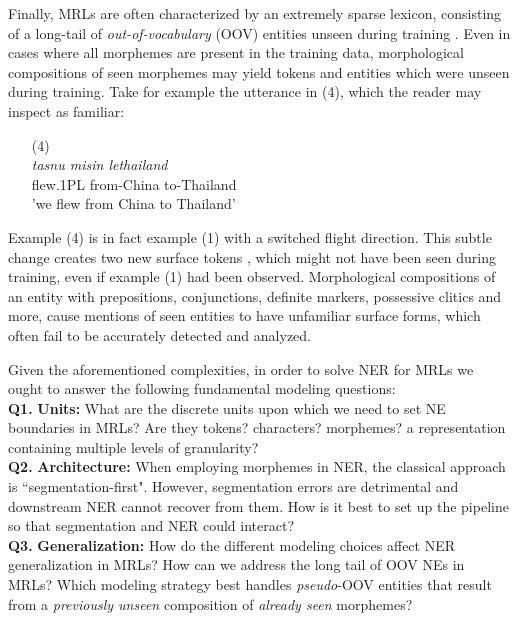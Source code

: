 \documentclass[11pt,a4paper]{article}
\begin{document}
Finally, MRLs are often characterized by 
an extremely sparse lexicon, consisting of a long-tail of {\em out-of-vocabulary} (OOV) entities unseen during training
\cite{czarnowska-etal-2019-dont}. Even in cases where all morphemes are present in the training data,  morphological compositions of seen morphemes 
may yield  tokens and entities which were unseen during training.  Take for example the utterance in (4), which the reader may inspect as  familiar:
\begin{itemize}
    \item[(4)] \\
    {\em tasnu  \hspace{0.8cm} misin \hspace{1.2cm} lethailand}\\
    {\small flew.1PL \hspace{0.4cm} from-China \hspace{0.45cm} to-Thailand}\\
    'we flew from China to Thailand'
\end{itemize} 
Example (4) is in fact example (1) with a switched flight direction. This subtle change  creates two new surface tokens ,  which might not have been seen during training, even if example (1) had been observed.  Morphological  compositions 
of an entity with prepositions, conjunctions, definite markers, possessive clitics and more,
cause  mentions of seen entities to have unfamiliar  surface forms, which often fail to be accurately detected and analyzed.
 
Given the aforementioned complexities, in order to solve NER for MRLs we ought to answer the following fundamental modeling questions:
  \\{\bf Q1.} {\bf  Units:}
What are the discrete units upon which we need to set NE boundaries in MRLs?
Are they  tokens?  characters? morphemes?   a representation  containing multiple levels of granularity?
  \\{\bf Q2.} {\bf Architecture:}
When employing morphemes in NER, the classical approach is  ``segmentation-first".
However, segmentation errors are detrimental and downstream NER cannot recover from them. 
How  is it best  to set up the pipeline so that segmentation and NER could interact?
  \\{\bf Q3.}  {\bf Generalization:}
How do the different modeling choices affect NER generalization in MRLs? 
How can we address the long tail of OOV NEs in MRLs? 
Which modeling strategy best handles {\em pseudo}-OOV entities that result from a {\em previously unseen}  {composition} of {\em already seen} morphemes?
\end{document}
